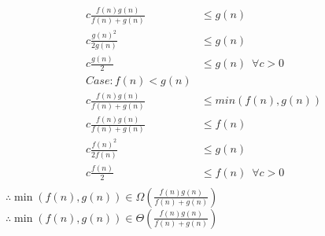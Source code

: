 \documentclass[12pt]{article}
\begin{document}
\begin{enumerate}[(a)]
\begin{align*}
c \frac{f(n)g(n)}{f(n)+g(n)} &\leq g(n)\\
c \frac{g(n)^2}{2g(n)} &\leq g(n)\\
c \frac{g(n)}{2} &\leq g(n) \enspace \forall c >0\\
Case: f(n) < g(n)\\
c \frac{f(n)g(n)}{f(n)+g(n)} &\leq min(f(n),g(n))\\
c \frac{f(n)g(n)}{f(n)+g(n)} &\leq f(n)\\
c \frac{f(n)^2}{2f(n)} &\leq g(n)\\
c \frac{f(n)}{2} &\leq f(n) \enspace \forall c >0\\
\end{align*}
$\therefore \min(f(n),g(n)) \in \Omega\left (\frac{f(n)g(n)}{f(n)+g(n)}\right)$
$\therefore \min(f(n),g(n)) \in \Theta\left (\frac{f(n)g(n)}{f(n)+g(n)}\right)$
\end{enumerate}
\end{document}
